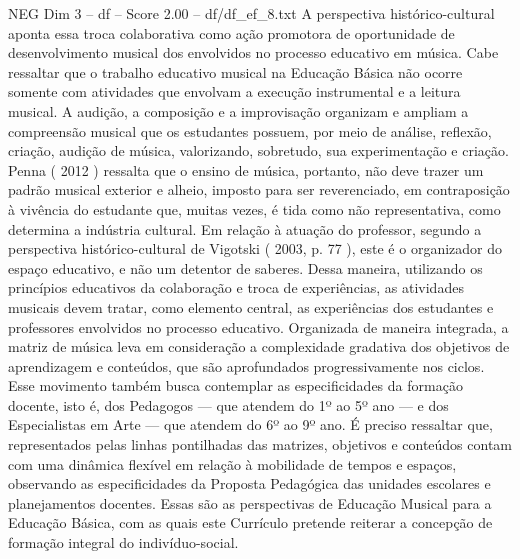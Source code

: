 \begin{textsample}{NEG Dim 3 – df – Score 2.00 – df/df\_ef\_8.txt}
A perspectiva histórico-cultural aponta essa troca colaborativa como ação promotora de oportunidade de desenvolvimento musical dos envolvidos no processo educativo em música.
Cabe ressaltar que o trabalho educativo musical na Educação Básica não ocorre somente com atividades que envolvam a execução instrumental e a leitura musical.
A audição, a composição e a improvisação organizam e ampliam a compreensão musical que os estudantes possuem, por meio de análise, reflexão, criação, audição de música, valorizando, sobretudo, sua experimentação e criação.
Penna ( 2012 ) ressalta que o ensino de música, portanto, não deve trazer um padrão musical exterior e alheio, imposto para ser reverenciado, em contraposição à vivência do estudante que, muitas vezes, é tida como não representativa, como determina a indústria cultural.
Em relação à atuação do professor, segundo a perspectiva histórico-cultural de Vigotski ( 2003, p. 77 ), este é o organizador do espaço educativo, e não um detentor de saberes.
Dessa maneira, utilizando os princípios educativos da colaboração e troca de experiências, as atividades musicais devem tratar, como elemento central, as experiências dos estudantes e professores envolvidos no processo educativo.
Organizada de maneira integrada, a matriz de música leva em consideração a complexidade gradativa dos objetivos de aprendizagem e conteúdos, que são aprofundados progressivamente nos ciclos.
Esse movimento também busca contemplar as especificidades da formação docente, isto é, dos Pedagogos — que atendem do 1º ao 5º ano — e dos Especialistas em Arte — que atendem do 6º ao 9º ano.
É preciso ressaltar que, representados pelas linhas pontilhadas das matrizes, objetivos e conteúdos contam com uma dinâmica flexível em relação à mobilidade de tempos e espaços, observando as especificidades da Proposta Pedagógica das unidades escolares e planejamentos docentes.
Essas são as perspectivas de Educação Musical para a Educação Básica, com as quais este Currículo pretende reiterar a concepção de formação integral do indivíduo-social.

\end{textsample}
